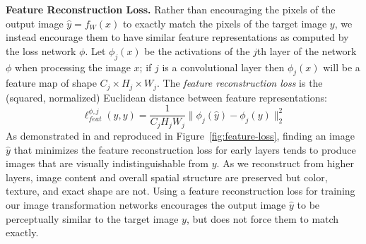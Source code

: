 \documentclass[runningheads]{llncs}
\begin{document}
\vspace{1mm}
\noindent\textbf{Feature Reconstruction Loss.}
Rather than encouraging the pixels of the output image $\hat y=f_W(x)$ to exactly match
the pixels of the target image $y$, we instead encourage them to have similar feature
representations as computed by the loss network $\phi$. Let $\phi_j(x)$ be the activations
of the $j$th layer of the network $\phi$ when processing the image $x$; if $j$ is a
convolutional layer then $\phi_j(x)$ will be a feature map of shape
$C_j \times H_j \times W_j$. The \emph{feature reconstruction loss} is
the (squared, normalized) Euclidean distance between feature representations:
\begin{equation}
  \ell_{feat}^{\phi,j}(\hat y, y) = 
  \frac1{C_jH_jW_j}\|\phi_j(\hat y) - \phi_j(y)\|_2^2
\end{equation}
As demonstrated in \cite{mahendran15understanding} and reproduced in
Figure~\ref{fig:feature-loss}, finding an image $\hat y$ that minimizes the feature
reconstruction loss for early layers tends to produce images that are visually
indistinguishable from $y$. As we reconstruct from higher layers, image content
and overall spatial structure are preserved but color, texture, and exact shape are not.
Using a feature reconstruction loss for training our image transformation networks encourages
the output image $\hat y$ to be perceptually similar to the target image $y$, but does not
force them to match exactly.

\end{document}
